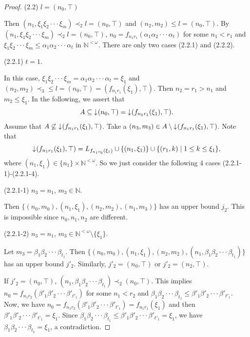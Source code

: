 \documentclass[preprint,12pt]{elsarticle}
\numberwithin{equation}{section}
\newcommand{\dn}{\mathord{\downarrow}\hspace{0.05em}}
\begin{document}
\begin{proof}
(2.2) $l=(n_{0},\top)$

Then $(n_{1},\xi_{1}\xi_{2}\cdot\cdot\cdot\xi_{m})\prec_{2}l=(n_{0},\top)$ and $(n_{2},m_{2})\leq l=(n_{0},\top)$. By $(n_{1},\xi_{1}\xi_{2}\cdot\cdot\cdot\xi_{m})\prec_{2}l=(n_{0},\top)$, $n_{0}=f_{n_{1}r_{1}}(\alpha_{1}\alpha_{2}\cdot\cdot\cdot\alpha_{t})$ for some $n_{1}<r_{1}$ and $\xi_{1}\xi_{2}\cdot\cdot\cdot\xi_{m}\leq\alpha_{1}\alpha_{2}\cdot\cdot\cdot\alpha_{t}$ in $\mathbb{N}^{<\omega}$. There are only two cases (2.2.1) and (2.2.2).

(2.2.1) $t=1$.

In this case, $\xi_{1}\xi_{2}\cdot\cdot\cdot\xi_{m}=\alpha_{1}\alpha_{2}\cdot\cdot\cdot\alpha_{t}=\xi_{1}$ and $(n_{2},m_{2})\prec_{3}\leq l=(n_{0},\top)=(f_{n_{1}r_{1}}(\xi_{1}),\top)$. Then $n_{2}=r_{1}>n_{1}$ and $m_{2}\leq\xi_{1}$. In the following, we assert that $$A\subseteq\dn(n_{0},\top)=\dn(f_{n_{1}r_{1}}(\xi_{1}),\top).$$
Assume that $A\not\subseteq\dn(f_{n_{1}r_{1}}(\xi_{1}),\top)$. Take a $(n_{3},m_{3})\in A\setminus\dn(f_{n_{1}r_{1}}(\xi_{1}),\top)$. Note that
$$\dn(f_{n_{1}r_{1}}(\xi_{1}),\top)=L_{f_{n_{1}r_{6}}(\xi_{1})}\cup\{(n_{1},\xi_{1})\}\cup\{(r_{1},k)\mid 1\leq k\leq\xi_{1}\},$$
where $(n_{1},\xi_{1})\in\{n_{1}\}\times\mathbb{N}^{<\omega}$. So we just consider the following 4 cases (2.2.1-1)-(2.2.1-4).

(2.2.1-1) $n_{3}=n_{1}$, $m_{3}\in\mathbb{N}$.

Then $\{(n_{0},m_{0}),(n_{1},\xi_{1}),(n_{2},m_{2}),(n_{1},m_{3})\}$ has an upper bound $j_{2}$. This is impossible since $n_{0},n_{1},n_{2}$ are different.

(2.2.1-2) $n_{3}=n_{1}$, $m_{3}\in\mathbb{N}^{<\omega}\setminus\{\xi_{1}\}$.

Let $m_{3}=\beta_{1}\beta_{2}\cdot\cdot\cdot\beta_{t_{1}}$. Then $\{(n_{0},m_{0}),(n_{1},\xi_{1}),(n_{2},m_{2}),(n_{1},\beta_{1}\beta_{2}\cdot\cdot\cdot\beta_{t_{1}})\}$ has an upper bound $j'_{2}$.
Similarly, $j'_{2}=(n_{0},\top)$ or $j'_{2}=(n_{2},\top)$.

If $j'_{2}=(n_{0},\top)$, $(n_{1},\beta_{1}\beta_{2}\cdot\cdot\cdot\beta_{t_{1}})\prec_{2}(n_{0},\top)$. This implies $n_{0}=f_{n_{1}r_{2}}(\beta'_{1}\beta'_{2}\cdot\cdot\cdot\beta'_{t'_{1}})$ for some $n_{1}<r_{2}$ and $\beta_{1}\beta_{2}\cdot\cdot\cdot\beta_{t_{1}}\leq\beta'_{1}\beta'_{2}\cdot\cdot\cdot\beta'_{t'_{1}}$. Now, we have $n_{0}=f_{n_{1}r_{2}}(\beta'_{1}\beta'_{2}\cdot\cdot\cdot\beta'_{t'_{1}})=f_{n_{1}r_{1}}(\xi_{1})$ and then $\beta'_{1}\beta'_{2}\cdot\cdot\cdot\beta'_{t'_{1}}=\xi_{1}$. Since $\beta_{1}\beta_{2}\cdot\cdot\cdot\beta_{t_{1}}\leq\beta'_{1}\beta'_{2}\cdot\cdot\cdot\beta'_{t'_{1}}=\xi_{1}$, we have $\beta_{1}\beta_{2}\cdot\cdot\cdot\beta_{t_{1}}=\xi_{1}$, a contradiction.


\end{proof}
\end{document}
